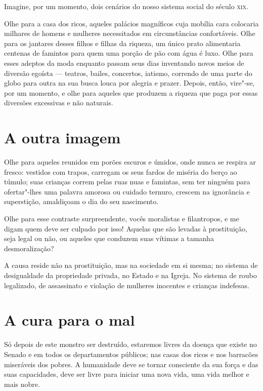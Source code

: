 Imagine, por um momento, dois cenários do nosso sistema social do século \textsc{xix}.

Olhe para a casa dos ricos, aqueles palácios magníficos cuja mobília
cara colocaria milhares de homens e mulheres necessitados em
circunstâncias confortáveis. Olhe para os jantares desses filhos e
filhas da riqueza, um único prato alimentaria centenas de famintos para
quem uma porção de pão com água é luxo. Olhe para esses adeptos da moda
enquanto passam seus dias inventando novos meios de diversão egoísta --- teatros, bailes, concertos, iatismo, correndo de uma parte do globo para
outra na sua busca louca por alegria e prazer. Depois, então, vire"-se,
por um momento, e olhe para aqueles que produzem a riqueza que paga por
essas diversões excessivas e não naturais.

\section{A outra imagem}

Olhe para aqueles reunidos em porões escuros e úmidos, onde nunca se respira
ar fresco: vestidos com trapos, carregam os seus fardos de miséria do
berço ao túmulo; suas crianças correm pelas ruas nuas e famintas, sem ter ninguém para ofertar"-lhes uma palavra amorosa ou cuidado ternuro, crescem na ignorância e superstição, amaldiçoam o dia do seu nascimento.

Olhe para esse contraste surpreendente, vocês moralistas e filantropos,
e me digam quem deve ser culpado por isso! Aquelas que são levadas à
prostituição, seja legal ou não, ou aqueles que conduzem suas vítimas a
tamanha desmoralização?

A causa reside não na prostituição, mas na sociedade em si mesma; no
sistema de desigualdade da propriedade privada, no Estado e na Igreja. No
sistema de roubo legalizado, de assassinato e violação de mulheres
inocentes e crianças indefesas.

\section{A cura para o mal}

Só depois de este monstro ser destruído, estaremos livres da doença que
existe no Senado e em todos os departamentos públicos; nas casas dos
ricos e nos barracões miseráveis dos pobres. A humanidade deve
se tornar consciente da sua força e das suas capacidades, deve ser livre
para iniciar uma nova vida, uma vida melhor e mais nobre.

